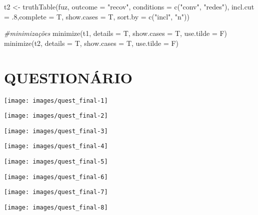 \documentclass[
	12pt,				%
	oneside,			%
	a4paper,			%
	sumario=tradicional,
	english,			%
	brazil				%
	]{abntex2}
\newenvironment{Shaded}{\begin{snugshade}}{\end{snugshade}}
\newcommand{\AttributeTok}[1]{\textcolor[rgb]{0.77,0.63,0.00}{#1}}
\newcommand{\CommentTok}[1]{\textcolor[rgb]{0.56,0.35,0.01}{\textit{#1}}}
\newcommand{\DecValTok}[1]{\textcolor[rgb]{0.00,0.00,0.81}{#1}}
\newcommand{\FunctionTok}[1]{\textcolor[rgb]{0.00,0.00,0.00}{#1}}
\newcommand{\NormalTok}[1]{#1}
\newcommand{\OtherTok}[1]{\textcolor[rgb]{0.56,0.35,0.01}{#1}}
\newcommand{\StringTok}[1]{\textcolor[rgb]{0.31,0.60,0.02}{#1}}
\begin{document}
\begin{Shaded}
\begin{Highlighting}[]
\NormalTok{t2 }\OtherTok{\textless{}{-}} \FunctionTok{truthTable}\NormalTok{(fuz, }\AttributeTok{outcome =} \StringTok{"recov"}\NormalTok{,}
                 \AttributeTok{conditions =} \FunctionTok{c}\NormalTok{(}\StringTok{"conv"}\NormalTok{, }\StringTok{"redes"}\NormalTok{),}
                 \AttributeTok{incl.cut =}\NormalTok{ .}\DecValTok{8}\NormalTok{,}\AttributeTok{complete =}\NormalTok{ T, }\AttributeTok{show.cases =}\NormalTok{ T, }
                 \AttributeTok{sort.by =} \FunctionTok{c}\NormalTok{(}\StringTok{"incl"}\NormalTok{, }\StringTok{"n"}\NormalTok{))}

\CommentTok{\#minimizações}
\FunctionTok{minimize}\NormalTok{(t1, }\AttributeTok{details =}\NormalTok{ T, }\AttributeTok{show.cases =}\NormalTok{ T, }\AttributeTok{use.tilde =}\NormalTok{ F)}
\FunctionTok{minimize}\NormalTok{(t2, }\AttributeTok{details =}\NormalTok{ T, }\AttributeTok{show.cases =}\NormalTok{ T, }\AttributeTok{use.tilde =}\NormalTok{ F)}
\end{Highlighting}
\end{Shaded}
\hypertarget{questionuxe1rio}{%
\chapter{\texorpdfstring{\textbf{QUESTIONÁRIO}}{QUESTIONÁRIO}}\label{questionuxe1rio}}
\begin{center}\texttt{[image: images/quest\_final-1]} \end{center}
\begin{center}\texttt{[image: images/quest\_final-2]} \end{center}
\begin{center}\texttt{[image: images/quest\_final-3]} \end{center}
\begin{center}\texttt{[image: images/quest\_final-4]} \end{center}
\begin{center}\texttt{[image: images/quest\_final-5]} \end{center}
\begin{center}\texttt{[image: images/quest\_final-6]} \end{center}
\begin{center}\texttt{[image: images/quest\_final-7]} \end{center}
\begin{center}\texttt{[image: images/quest\_final-8]} \end{center}
\end{document}
